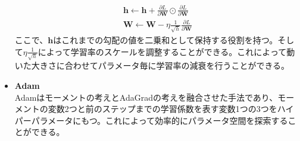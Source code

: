 \begin{itemize}
\begin{align}
\mathbf{h} \leftarrow \mathbf{h} + \frac{\partial L}{\partial \mathbf{W}} \odot \frac{\partial L}{\partial \mathbf{W}} \\
\mathbf{W} \leftarrow \mathbf{W} - \eta \frac{1}{\sqrt{h}} \frac{\partial L}{\partial \mathbf{W}}
\end{align}
ここで、$\mathbf{h}$はこれまでの勾配の値を二乗和として保持する役割を持つ。そして$\eta \frac{1}{\sqrt{h}}$によって学習率のスケールを調整することができる。これによって動いた大きさに合わせてパラメータ毎に学習率の減衰を行うことができる。
\item \textbf{Adam}\\
Adamはモーメントの考えとAdaGradの考えを融合させた手法であり、モーメントの変数2つと前のステップまでの学習係数を表す変数1つの3つをハイパーパラメータにもつ。これによって効率的にパラメータ空間を探索することができる。
\end{itemize}
